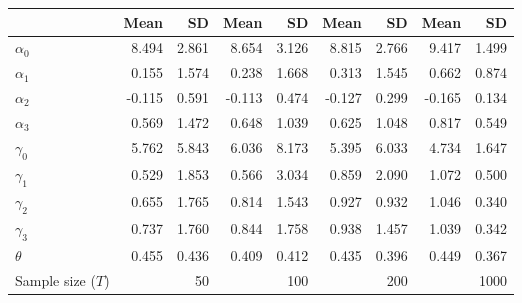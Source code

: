 
\begin{tabular}[t]{lrrrrrrrr}
\toprule
  & Mean & SD & Mean  & SD  & Mean   & SD   & Mean    & SD   \\
\midrule
$\alpha_{0}$ & 8.494 & 2.861 & 8.654 & 3.126 & 8.815 & 2.766 & 9.417 & 1.499\\
$\alpha_{1}$ & 0.155 & 1.574 & 0.238 & 1.668 & 0.313 & 1.545 & 0.662 & 0.874\\
$\alpha_{2}$ & -0.115 & 0.591 & -0.113 & 0.474 & -0.127 & 0.299 & -0.165 & 0.134\\
$\alpha_{3}$ & 0.569 & 1.472 & 0.648 & 1.039 & 0.625 & 1.048 & 0.817 & 0.549\\
$\gamma_{0}$ & 5.762 & 5.843 & 6.036 & 8.173 & 5.395 & 6.033 & 4.734 & 1.647\\
$\gamma_{1}$ & 0.529 & 1.853 & 0.566 & 3.034 & 0.859 & 2.090 & 1.072 & 0.500\\
$\gamma_{2}$ & 0.655 & 1.765 & 0.814 & 1.543 & 0.927 & 0.932 & 1.046 & 0.340\\
$\gamma_{3}$ & 0.737 & 1.760 & 0.844 & 1.758 & 0.938 & 1.457 & 1.039 & 0.342\\
$\theta$ & 0.455 & 0.436 & 0.409 & 0.412 & 0.435 & 0.396 & 0.449 & 0.367\\
Sample size ($T$) &  & 50 &  & 100 &  & 200 &  & 1000\\
\bottomrule
\end{tabular}
